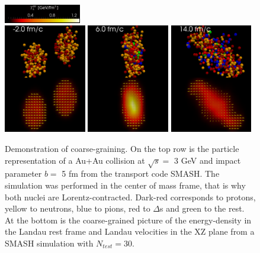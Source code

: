 \begin{figure}
  \centering
  \includegraphics[width = 0.3\textwidth]{illustrations/coarse_graining/color_legend_T00.png} \\
  \includegraphics[width = 0.32\textwidth]{illustrations/coarse_graining/coarse_AuAu_sqrts3GeV_b5_0000.png}
  \includegraphics[width = 0.32\textwidth]{illustrations/coarse_graining/coarse_AuAu_sqrts3GeV_b5_0004.png}
  \includegraphics[width = 0.32\textwidth]{illustrations/coarse_graining/coarse_AuAu_sqrts3GeV_b5_0008.png}
  \caption{Demonstration of coarse-graining. On the top row is the particle
           representation of a Au+Au
           collision at $\sqrt{s} = $ 3 GeV and impact parameter $b = $
           5 fm from the transport code SMASH. The simulation was performed in the
           center of mass frame, that is why both nuclei are Lorentz-contracted.
           Dark-red corresponds to protons,
           yellow to neutrons, blue to pions, red to $\Delta$s and green to the rest.
           At the bottom is the coarse-grained picture of the energy-density in the
           Landau rest
           frame and Landau velocities in the XZ plane from a SMASH simulation with
           $N_{test} = 30$.}
  \label{fig:HIC_exp_mindmap}
\end{figure}

